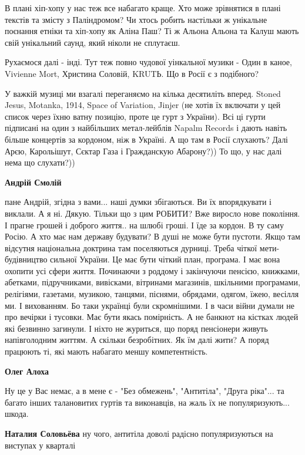 \begin{itemize}
\begin{itemize}
В плані хіп-хопу у нас теж все набагато краще. Хто може зрівнятися в плані
текстів та змісту з Паліндромом? Чи хтось робить настільки ж унікальне поєнання
етніки та хіп-хопу як Аліна Паш? Ті ж Альона Альона та Калуш мають свій
унікальний саунд, який ніколи не сплутаєш.

Рухаємося далі - інді. Тут теж повно чудової уінкальної музики - Один в каное,
Vivienne Mort, Христина Соловій, KRUTЬ. Що в Росії є з подібного?

У важкій музиці ми взагалі переганяємо на кілька десятиліть вперед. Stoned
Jesus, Motanka, 1914, Space of Variation, Jinjer (не хотів їх включати у цей
список через їхню ватну позицію, проте це гурт з України). Всі ці гурти
підписані на один з найбільших метал-лейблів Napalm Records і дають навіть
більше концертів за кордоном, ніж в Україні. А що там в Росії слухають? Далі
Арєю, Карольішут, Сєктар Газа і Гражданскую Абарону?)) То що, у нас далі нема
що слухати?))

\textbf{Андрій Смолій} 

пане Андрій, згідна з вами... наші думки збігаються. Ви їх впорядкувати і
виклали. А я ні. Дякую. Тільки що з цим РОБИТИ? Вже виросло нове покоління. І
прагне грошей і доброго життя.. на шлюбі гроші. І їде за кордон. В ту саму
Росію. А хто має нам державу будувати? В душі не може бути пустоти. Якщо там
відсутня національна доктрина там поселяються дурниці. Треба чіткої мети-
будівництво сильної України. Це має бути чіткий план, програма. І має вона
охопити усі сфери життя. Починаючи з роддому і закінчуючи пенсією, книжками,
абетками, підручниками, вивісками, вітринами магазинів, шкільними програмами,
релігіями, газетами, музикою, танцями, піснями, обрядами, одягом, їжею, весілля
ми. І вихованням. Бо таки українці були скромнішими. І в часи війни думали не
про вечірки і тусовки. Має бути якась помірність. А не банкнот на кістках людей
які безвинно загинули. І ніхто не журиться, що поряд пенсіонери живуть
напівголодним життям. А скільки безробітних. Як їм далі жити? А поряд працюють
ті, які мають набагато меншу компетентність.

\textbf{Олег Алоха} 

Ну це у Вас немає, а в мене є - "Без обмежень", "Антитіла", "Друга ріка"... та
багато інших талановитих гуртів та виконавців, на жаль їх не
популяризують... шкода.

\textbf{Наталия Соловьёва} ну чого, антитіла доволі радісно популяризуються на виступах у кварталі


\end{itemize}
\end{itemize}
